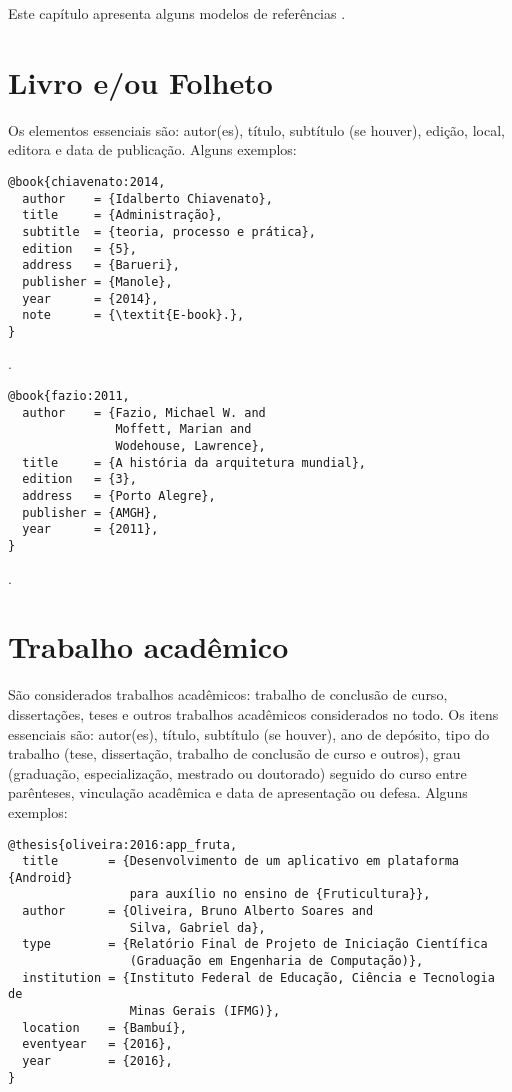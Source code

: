 Este capítulo apresenta alguns modelos de referências \cite{ifmg:2020:manual}.

\section{Livro e/ou Folheto}

Os elementos essenciais são: autor(es), título, subtítulo (se houver), edição, local, editora e data de publicação.
Alguns exemplos:

\vspace*{1em}

\begin{Verbatim}[frame=single]
@book{chiavenato:2014,
  author    = {Idalberto Chiavenato},
  title     = {Administração},
  subtitle  = {teoria, processo e prática},
  edition   = {5},
  address   = {Barueri},
  publisher = {Manole},
  year      = {2014},
  note      = {\textit{E-book}.},
}
\end{Verbatim}

\noindent
{}.

\vspace*{1em}

\begin{Verbatim}[frame=single]
@book{fazio:2011,
  author    = {Fazio, Michael W. and
               Moffett, Marian and
               Wodehouse, Lawrence},
  title     = {A história da arquitetura mundial},
  edition   = {3},
  address   = {Porto Alegre},
  publisher = {AMGH},
  year      = {2011},
}
\end{Verbatim}

\noindent
{}.

\section{Trabalho acadêmico}

São considerados trabalhos acadêmicos: trabalho de conclusão de curso, dissertações, teses e outros trabalhos acadêmicos considerados no todo.
Os itens essenciais são: autor(es), título, subtítulo (se houver), ano de depósito, tipo do trabalho (tese, dissertação, trabalho de conclusão de curso e outros), grau (graduação, especialização, mestrado ou doutorado) seguido do curso entre parênteses, vinculação acadêmica e data de apresentação ou defesa.
Alguns exemplos:

\vspace*{1em}

\begin{Verbatim}[frame=single]
@thesis{oliveira:2016:app_fruta,
  title       = {Desenvolvimento de um aplicativo em plataforma {Android}
                 para auxílio no ensino de {Fruticultura}},
  author      = {Oliveira, Bruno Alberto Soares and
                 Silva, Gabriel da},
  type        = {Relatório Final de Projeto de Iniciação Científica
                 (Graduação em Engenharia de Computação)},
  institution = {Instituto Federal de Educação, Ciência e Tecnologia de
                 Minas Gerais (IFMG)},
  location    = {Bambuí},
  eventyear   = {2016},
  year        = {2016},
}
\end{Verbatim}

